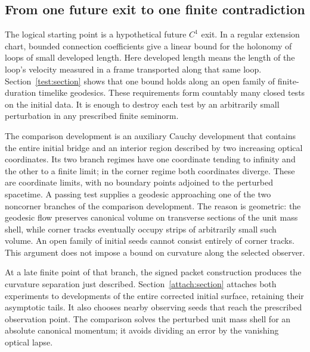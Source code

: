 \subsection{From one future exit to one finite contradiction}

The logical starting point is a hypothetical future $C^1$ exit.
In a regular extension chart, bounded connection coefficients give
a linear bound for the holonomy of loops of small developed length.
Here developed length means the length of the loop's velocity measured
in a frame transported along that same loop. Section~\ref{test:section}
shows that one bound holds along an open family of finite-duration
timelike geodesics. These requirements form countably many closed
tests on the initial data. It is enough to destroy each test by an
arbitrarily small perturbation in any prescribed finite seminorm.

The comparison development is an auxiliary Cauchy development that
contains the entire initial bridge and an interior region described
by two increasing optical coordinates. Its two branch regimes have
one coordinate tending to infinity and the other to a finite limit;
in the corner regime both coordinates diverge. These are coordinate
limits, with no boundary points adjoined to the perturbed spacetime.
A passing test supplies a geodesic approaching one of the two
noncorner branches of the comparison development. The reason is
geometric: the geodesic flow preserves canonical volume on transverse
sections of the unit mass shell, while corner tracks eventually occupy
strips of arbitrarily small such volume. An open family of initial
seeds cannot consist entirely of corner tracks. This argument does
not impose a bound on curvature along the selected observer.

At a late finite point of that branch, the signed packet construction
produces the curvature separation just described. Section~\ref{attach:section}
attaches both experiments to developments of the entire corrected
initial surface, retaining their asymptotic tails. It also chooses
nearby observing seeds that reach the prescribed observation point.
The comparison solves the perturbed unit mass shell for an absolute
canonical momentum; it avoids dividing an error by the vanishing
optical lapse.


